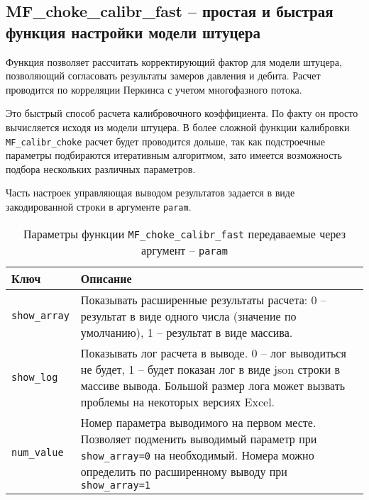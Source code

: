 \subsection{MF\_choke\_calibr\_fast – простая и быстрая функция настройки модели штуцера}
Функция позволяет рассчитать корректирующий фактор для модели штуцера, позволяющий согласовать результаты замеров давления и дебита. Расчет проводится по корреляции Перкинса \cite{Perkins_1993} с учетом многофазного потока.  

Это быстрый способ расчета калибровочного коэффициента. По факту он просто вычисляется исходя из модели штуцера.
В более сложной функции калибровки \texttt{MF_calibr_choke} расчет будет проводится дольше, так как подстроечные параметры подбираются итеративным алгоритмом, зато имеется возможность подбора нескольких различных параметров.


Часть настроек управляющая выводом результатов задается в виде закодированной строки в аргументе \texttt{param}.

\begin{table}[H]
	\caption{Параметры функции  \texttt{MF_choke_calibr_fast} передаваемые через аргумент -- \texttt{param}}
	\label{table:param_list_choke_calibr_fast}
	\begin{tabular}{p{}p{}}
		\hline
		Ключ & Описание  \\ \hline
		\texttt{show_array} & Показывать расширенные результаты расчета: 0 -- результат в виде одного числа (значение по умолчанию), 1 -- результат в виде массива.    \\ \hline
		
		\texttt{show_log} & Показывать лог расчета в выводе. 0 -- лог выводиться не будет, 1 -- будет показан лог в виде json строки в массиве вывода. Большой размер лога может вызвать проблемы на некоторых версиях Excel.   \\ \hline
		
		\texttt{num_value} & Номер параметра выводимого на первом месте. Позволяет подменить выводимый параметр при \texttt{show_array=0} на необходимый. Номера можно определить по расширенному выводу при \texttt{show_array=1}  \\ \hline
	\end{tabular}
\end{table}

